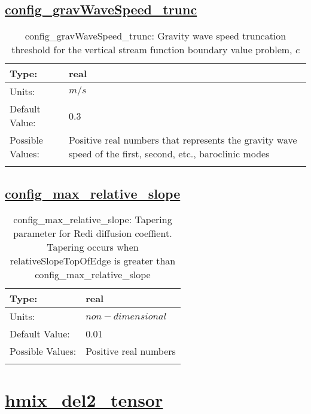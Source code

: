 \subsection[config\_gravWaveSpeed\_trunc]{\hyperref[sec:nm_tab_mesoscale_eddy_parameterization]{config\_gravWaveSpeed\_trunc}}
\label{subsec:nm_sec_config_gravWaveSpeed_trunc}
\begin{center}
\begin{longtable}{| p{2.0in} || p{4.0in} |}
    \hline
    Type: & real \\
    \hline
    Units: & $m/s$ \\
    \hline
    Default Value: & 0.3 \\
    \hline
    Possible Values: & Positive real numbers that represents the gravity wave speed of the first, second, etc., baroclinic modes \\
    \hline
    \caption{config\_gravWaveSpeed\_trunc:  Gravity wave speed truncation threshold for the vertical stream function boundary value problem,  $c$ }
\end{longtable}
\end{center}
\subsection[config\_max\_relative\_slope]{\hyperref[sec:nm_tab_mesoscale_eddy_parameterization]{config\_max\_relative\_slope}}
\label{subsec:nm_sec_config_max_relative_slope}
\begin{center}
\begin{longtable}{| p{2.0in} || p{4.0in} |}
    \hline
    Type: & real \\
    \hline
    Units: & $non-dimensional$ \\
    \hline
    Default Value: & 0.01 \\
    \hline
    Possible Values: & Positive real numbers \\
    \hline
    \caption{config\_max\_relative\_slope: Tapering parameter for Redi diffusion coeffient.  Tapering occurs when relativeSlopeTopOfEdge is greater than config\_max\_relative\_slope}
\end{longtable}
\end{center}
\section[hmix\_del2\_tensor]{\hyperref[sec:nm_tab_hmix_del2_tensor]{hmix\_del2\_tensor}}
\label{sec:nm_sec_hmix_del2_tensor}
